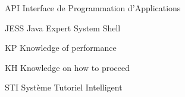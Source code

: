 \begin{abbreviations}
    \item[API] Interface de Programmation d'Applications
    \item[JESS] Java Expert System Shell
    \item[KP] Knowledge of performance
    \item[KH] Knowledge on how to proceed
    \item[STI] Système Tutoriel Intelligent
\end{abbreviations}

